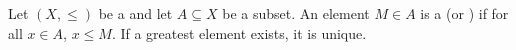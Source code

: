 \begin{definition} \label{definition:greatest_element_maximum_element_in_a_subset_of_a_partially_ordered_set}
Let $(X, \leq)$ be a  and let $A \subseteq X$ be a subset. An element $M \in A$ is a  (or ) if for all $x \in A$, $x \leq M$. If a greatest element exists, it is unique.
\end{definition}
